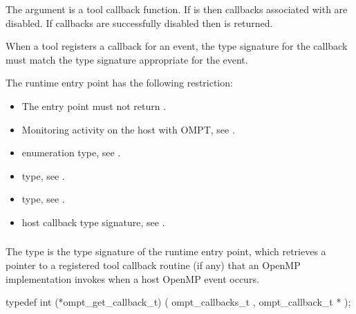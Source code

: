 The  argument is a tool callback function. If 
is  then callbacks associated with  are disabled. If
callbacks are successfully disabled then  is returned.

\constraints
When a tool registers a callback for an event, the type signature for the 
callback must match the type signature appropriate for the event.

\restrictions
The  runtime entry point has the following restriction:

\begin{itemize}
\item The entry point must not return .
\end{itemize}

\crossreferences
\begin{itemize}
\item Monitoring activity on the host with OMPT,
see .

\item {} enumeration type, see .

\item {} type, see .

\item {} type, see .

\item {} host callback type signature,
see .
\end{itemize}



\subsubsection{}
\label{sec:ompt_get_callback_t}
\label{sec:ompt_get_callback}

\summary
The  type is the type signature of the 
 runtime entry point, which retrieves a
pointer to a registered tool callback routine (if any) that an 
OpenMP implementation invokes when a host OpenMP event occurs.

\format
\begin{ccppspecific}
\begin{omptCallback}
typedef int (*ompt_get_callback_t) (
  ompt_callbacks_t ,
  ompt_callback_t *
);
\end{omptCallback}
\end{ccppspecific}

